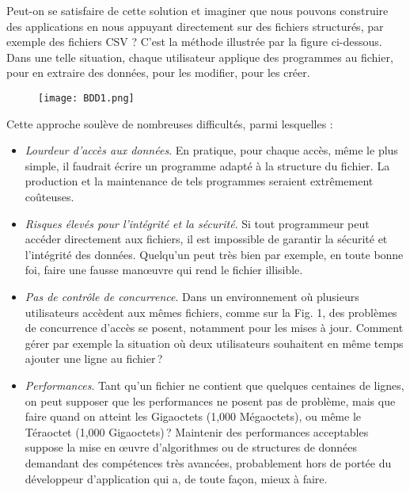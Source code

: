 \documentclass[
  letterpaper,
  DIV=11,
  numbers=noendperiod]{scrartcl}
\providecommand{\tightlist}{%
  \setlength{\itemsep}{0pt}\setlength{\parskip}{0pt}}\usepackage{longtable,booktabs,array}
\begin{document}
Peut-on se satisfaire de cette solution et imaginer que nous pouvons
construire des applications en nous appuyant directement sur des
fichiers structurés, par exemple des fichiers CSV ? C'est la méthode
illustrée par la figure ci-dessous. Dans une telle situation, chaque
utilisateur applique des programmes au fichier, pour en extraire des
données, pour les modifier, pour les créer.

\begin{figure}

{\centering \texttt{[image: BDD1.png]}

}

\end{figure}

Cette approche soulève de nombreuses difficultés, parmi lesquelles :

\begin{itemize}
\tightlist
\item
  \emph{Lourdeur d'accès aux données}. En pratique, pour chaque accès,
  même le plus simple, il faudrait écrire un programme adapté à la
  structure du fichier. La production et la maintenance de tels
  programmes seraient extrêmement coûteuses.
\item
  \emph{Risques élevés pour l'intégrité et la sécurité}. Si tout
  programmeur peut accéder directement aux fichiers, il est impossible
  de garantir la sécurité et l'intégrité des données. Quelqu'un peut
  très bien par exemple, en toute bonne foi, faire une fausse manœuvre
  qui rend le fichier illisible.
\item
  \emph{Pas de contrôle de concurrence}. Dans un environnement où
  plusieurs utilisateurs accèdent aux mêmes fichiers, comme sur la Fig.
  1, des problèmes de concurrence d'accès se posent, notamment pour les
  mises à jour. Comment gérer par exemple la situation où deux
  utilisateurs souhaitent en même temps ajouter une ligne au fichier\,?
\item
  \emph{Performances}. Tant qu'un fichier ne contient que quelques
  centaines de lignes, on peut supposer que les performances ne posent
  pas de problème, mais que faire quand on atteint les Gigaoctets (1,000
  Mégaoctets), ou même le Téraoctet (1,000 Gigaoctets)\,? Maintenir des
  performances acceptables suppose la mise en œuvre d'algorithmes ou de
  structures de données demandant des compétences très avancées,
  probablement hors de portée du développeur d'application qui a, de
  toute façon, mieux à faire.
\end{itemize}
\end{document}
